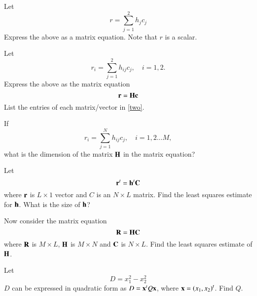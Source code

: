 
%
%
\begin{problem}
Let 
%
\begin{equation}
r = \sum_{j=1}^{2}h_{j}c_j 
\end{equation}
%
Express the above as a matrix  equation. Note that $r$ is a scalar.
\end{problem}
\begin{problem}
Let
%
\begin{equation}
r_i = \sum_{j=1}^{2}h_{ij}c_j, \quad i = 1,2.
\end{equation}
%
Express the above as the matrix equation
%
\begin{equation}
\label{two}
\mathbf{r} = \mathbf{H}\mathbf{c}
\end{equation}
%
List the entries of each matrix/vector in \eqref{two}.
	\end{problem}
	\begin{problem}
If
%
\begin{equation}
r_i = \sum_{j=1}^{N}h_{ij}c_j, \quad i = 1,2 \dots M,
\end{equation}
%
what is the dimension of the matrix $\mathbf{H}$ in the matrix equation? 
\end{problem}
\begin{problem}
Let
%
\begin{equation}
\mathbf{r}^t = \mathbf{h}^t\mathbf{C}
\end{equation}
%
where $\mathbf{r}$ is $L\times 1$ vector and  $C$ is an $N \times L$ matrix.  Find the least squares estimate for $\mathbf{h}$. What is the size of $\mathbf{h}$?
\end{problem}
\begin{problem}
Now consider the matrix equation
%
\begin{equation}
\mathbf{R} = \mathbf{H}\mathbf{C} 
\end{equation}
%
where $\mathbf{R}$ is $M\times L$, $\mathbf{H}$ is $M \times N$ and $\mathbf{C}$ is $N \times L$.  Find the least squares estimate of $\mathbf{H}$.
\end{problem}
\begin{problem}
Let
%
\begin{equation}
D = x_1^2 - x_2^2
\end{equation}
$D$ can be expressed in quadratic form as $D = \mathbf{x}^{t}Q\mathbf{x}$, where
$\mathbf{x} = \left(x_1,x_2\right)^{t}$.  Find $Q$.
\end{problem}
